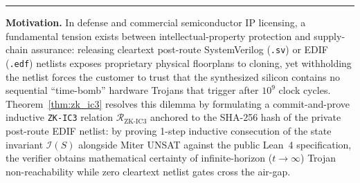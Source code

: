 \documentclass[10pt,twocolumn]{article}
\makeatletter
\newif\ifspecintwocol \specintwocolfalse
\newif\ifspecresume   \specresumefalse
\newcommand{\StopTwoCol}{%
  \if@twocolumn
    \onecolumn
    \global\specintwocolfalse
    \let\spec@next\@empty
  \else
    \ifspecintwocol
      \global\specintwocolfalse
      \def\spec@next{\end{multicols}}%
    \else
      \let\spec@next\@empty
    \fi
  \fi
  \spec@next
}
\newcommand{\BeginConnesPlate}{%
  \if@twocolumn
    \onecolumn
    \global\specresumetrue
    \let\spec@platepre\@empty
  \else
    \ifspecintwocol
      \global\specresumetrue
      \let\spec@platepre\StopTwoCol
    \else
      \global\specresumefalse
      \let\spec@platepre\@empty
    \fi
  \fi
  \spec@platepre
  \par\vspace{4pt}\noindent\textcolor{black!25}{\rule{\textwidth}{0.4pt}}\par\vspace{3pt}%
}
\theoremstyle{spectralthm}
\makeatother
\begin{document}
\BeginConnesPlate
\noindent\textbf{Motivation.}\; In defense and commercial semiconductor IP licensing, a fundamental tension exists between intellectual-property protection and supply-chain assurance: releasing cleartext post-route SystemVerilog (\texttt{.sv}) or EDIF (\texttt{.edf}) netlists exposes proprietary physical floorplans to cloning, yet withholding the netlist forces the customer to trust that the synthesized silicon contains no sequential ``time-bomb'' hardware Trojans that trigger after $10^9$ clock cycles. Theorem~\ref{thm:zk_ic3} resolves this dilemma by formulating a commit-and-prove inductive \texttt{ZK-IC3} relation $\mathcal{R}_{\mathrm{ZK\text{-}IC3}}$ anchored to the SHA-256 hash of the private post-route EDIF netlist: by proving 1-step inductive consecution of the state invariant $\mathcal{I}(S)$ alongside Miter UNSAT against the public Lean~4 specification, the verifier obtains mathematical certainty of infinite-horizon ($t \rightarrow \infty$) Trojan non-reachability while zero cleartext netlist gates cross the air-gap.
\end{document}
